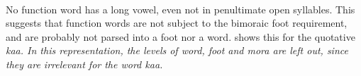  \\
No function word has a long vowel, even not in penultimate open syllables. This suggests that function words are not subject to the bimoraic foot requirement, and are probably not parsed into a foot nor a word.  shows this for the quotative \em ka\dentt a\em. In this representation, the levels of word, foot and mora are left out, since they are irrelevant for the word \em ka\dentt a\em. 


